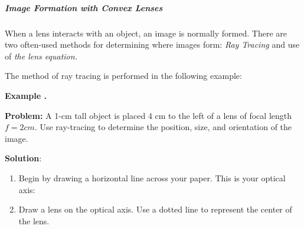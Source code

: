 \subparagraph{Image Formation with Convex Lenses}
When a lens interacts with an object, an image is normally formed.  There are two often-used methods for determining where images form: \textit{Ray Tracing} and use of \textit{the lens equation.}

The method of ray tracing is performed in the following example: 

\begin{mdframed}[backgroundcolor=blue!10!white]
	\begin{center}	
		\textbf{Example \thesection.}	
	\end{center}
	
	\textbf{Problem:} A 1-cm tall object is placed 4 cm to the left of a lens of focal length $f=2 \si{cm}$.  Use ray-tracing to determine the position, size, and orientation of the image.  

\textbf{Solution}: 


\begin{enumerate}
	\item Begin by drawing a horizontal line across your paper.  This is your optical axis: 
	\vspace{.5 in}
	\begin{center}
		

		\end{center}
	\vspace{.5 in}
	
	
	
	\item Draw a lens on the optical axis.  Use a dotted line to represent the center of the lens.  
	

	\begin{center}
		
		
	\end{center}


\end{enumerate}
\end{mdframed}
